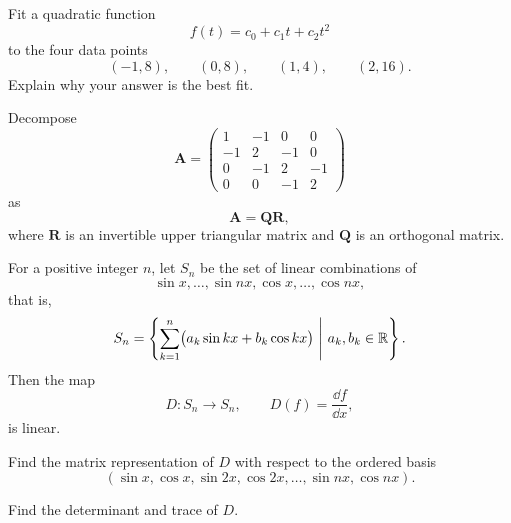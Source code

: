 \begin{problem}
Fit a quadratic function
\[
f(t)=c_0+c_1t+c_2t^2
\]
to the four data points
\[
(-1,8),\qquad(0,8),\qquad(1,4),\qquad(2,16).
\]
Explain why your answer is the best fit.
\end{problem}

\begin{problem}
Decompose
\[
\mathbf A=
\begin{pmatrix}
1&-1&0&0\\
-1&2&-1&0\\
0&-1&2&-1\\
0&0&-1&2
\end{pmatrix}
\]
as
\[
\mathbf A=\mathbf Q\mathbf R,
\]
where $\mathbf R$ is an invertible upper triangular matrix and $\mathbf Q$ is an orthogonal matrix.
\end{problem}

\begin{problem}
For a positive integer $n$, let $S_n$ be the set of linear combinations of
\[
\sin x,\dots,\sin nx,\cos x,\dots,\cos nx,
\]
that is,
\[
S_n=\left\{\sum_{k=1}^n\bigl(a_k\sin kx+b_k\cos kx\bigr)\ \middle|\ a_k,b_k\in\mathbb{R}\right\}.
\]
Then the map
\[
D\colon S_n\to S_n,
\qquad
D(f)=\frac{\dd f}{\dd x},
\]
is linear.
\begin{problemsubparts}
\item Find the matrix representation of $D$ with respect to the ordered basis
\[
(\sin x,\cos x,\sin 2x,\cos 2x,\dots,\sin nx,\cos nx).
\]
\item Find the determinant and trace of $D$.
\end{problemsubparts}
\end{problem}

